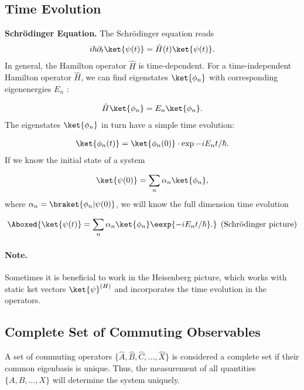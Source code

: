 \subsection{Time Evolution}

\textbf{Schrödinger Equation.} The Schrödinger equation reads
\begin{align}
i\hbar\partial_t\ket{\psi(t)}=\hat{H}(t)\ket{\psi(t)}.
\end{align}
In general, the Hamilton operator $\hat{H}$ is time-dependent. For a time-independent Hamilton operator $\hat{H}$, we can find eigenstates $\ket{\phi_n}$ with corresponding eigenenergies $E_n$ :

\begin{align}
\hat{H}\ket{\phi_n}=E_n\ket{\phi_n}.
\end{align}
The eigenstates $\ket{\phi_n}$ in turn have a simple time evolution:

\begin{align}
    \ket{\phi_n(t)}=\ket{\phi_n(0)}\cdot \exp{-i E_nt/\hbar}.
\end{align}
										If we know the initial state of a system

\begin{align}
						\ket{\psi(0)}=\sum_n \alpha_n\ket{\phi_n},
					
\end{align}
						where $\alpha_n=\braket{\phi_n | \psi(0)}$, we will know the full dimension time evolution

\begin{align}
						\Aboxed{\ket{\psi(t)}=\sum_n\alpha_n\ket{\phi_n}\eexp{-i E_n t/\hbar}.} \;\, \text{(Schrödinger picture)}
					
\end{align}
									\paragraph{Note.} Sometimes it is beneficial to work in the Heisenberg picture, which works with static ket vectors $\ket{\psi}^{(H)}$ and incorporates the time evolution in the operators.

\subsection{Complete Set of Commuting Observables}

A set of commuting operators $\{\hat{A},\hat{B},\hat{C},\dots,\hat{X}\}$ is considered a complete set if their common eigenbasis is 				unique. Thus, the measurement of all quantities $\{A,B,\dots,X\}$ will determine the system uniquely.

